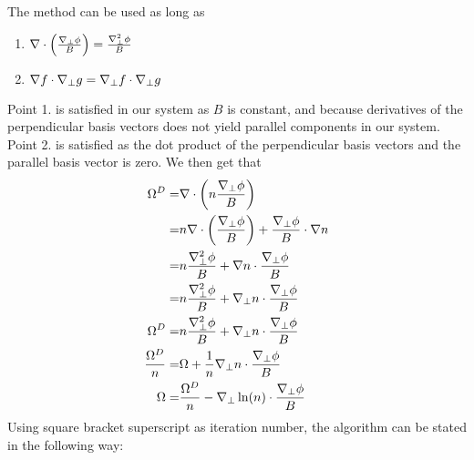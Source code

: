 The method can be used as long as
%
\begin{enumerate}
    \item $\nabla\cdot\left(\frac{\nabla_\perp\phi}{B}\right) = \frac{\nabla_\perp^2\phi}{B}$
    \item $\nabla f \cdot \nabla_\perp g = \nabla_\perp f \cdot \nabla_\perp g$
\end{enumerate}
%
Point 1. is satisfied in our system as $B$ is constant, and because derivatives
of the perpendicular basis vectors does not yield parallel components in our
system. Point 2. is satisfied as the dot product of the perpendicular basis
vectors and the parallel basis vector is zero. We then get that
%
\begin{align*}
    \Omega^D =& \nabla\cdot\left(n\frac{\nabla_\perp\phi}{B}\right)\\
    =& n\nabla\cdot\left(\frac{\nabla_\perp\phi}{B}\right) +
    \frac{\nabla_\perp\phi}{B}\cdot\nabla n
    \\
    =& n\frac{\nabla_\perp^2\phi}{B} +
    \nabla n\cdot\frac{\nabla_\perp\phi}{B}
    \\
    =& n\frac{\nabla_\perp^2\phi}{B} +
    \nabla_\perp n\cdot\frac{\nabla_\perp\phi}{B}
    \\
    \Omega^D =& n\frac{\nabla_\perp^2\phi}{B} +
    \nabla_\perp n\cdot\frac{\nabla_\perp\phi}{B}
    \\
    \frac{\Omega^D}{n} =& \Omega +
    \frac{1}{n}\nabla_\perp n\cdot\frac{\nabla_\perp\phi}{B}
    \\
    \Omega =& \frac{\Omega^D}{n} -
    \nabla_\perp \ln(n) \cdot\frac{\nabla_\perp\phi}{B}
\end{align*}
%
Using square bracket superscript as iteration number, the algorithm can be
stated in the following way:
%
